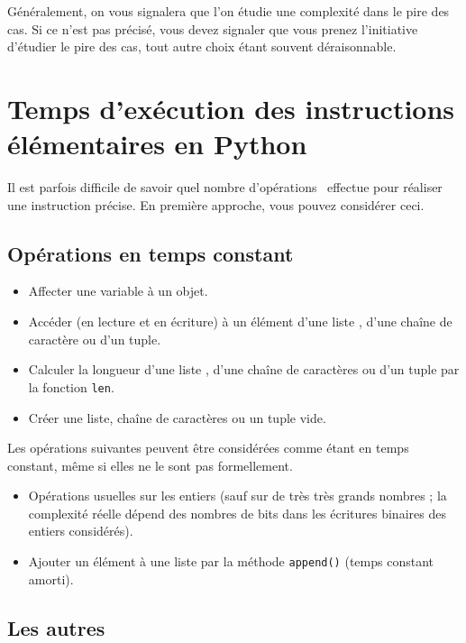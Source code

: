 Généralement, on vous signalera que l'on étudie une complexité dans le pire des cas. Si ce n'est pas précisé, vous devez signaler que vous prenez l'initiative d'étudier le pire des cas, tout autre choix étant souvent déraisonnable. 

\section{Temps d'exécution des instructions élémentaires en Python}

Il est parfois difficile de savoir quel nombre d'opérations \python\ effectue pour réaliser une instruction précise. 
En première approche, vous pouvez considérer ceci.

\subsection{Opérations en temps constant}

\begin{itemize}
  \item[\textbullet] Affecter une variable à un objet.
  \item[\textbullet] Accéder (en lecture et en écriture) à un élément d'une liste \python, d'une chaîne de caractère ou d'un tuple. 
  \item[\textbullet] Calculer la longueur d'une liste \python, d'une chaîne de caractères ou d'un tuple par la fonction \texttt{len}.
  \item[\textbullet] Créer une liste, chaîne de caractères ou un tuple vide.
\end{itemize}

Les opérations suivantes peuvent être considérées comme étant en temps constant, même si elles ne le sont pas formellement.

\begin{itemize}
  \item[\textbullet] Opérations usuelles sur les entiers (sauf sur de très très grands nombres ; la complexité réelle dépend des nombres de bits dans les écritures binaires des entiers considérés).
  \item[\textbullet] Ajouter un élément à une liste par la méthode \texttt{append()} (temps constant amorti).
\end{itemize}

\subsection{Les autres}

